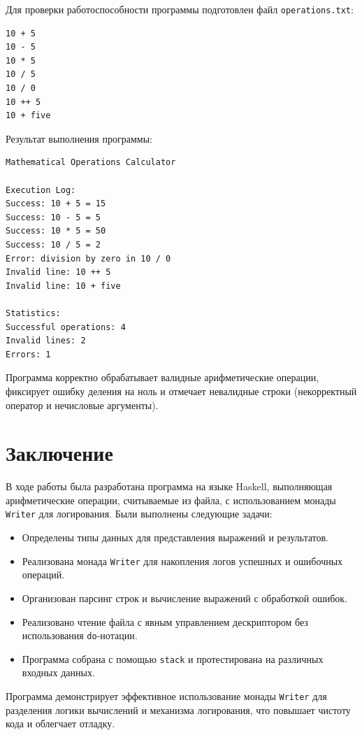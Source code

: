 \documentclass[a4paper, final]{article}
\begin{document}
Для проверки работоспособности программы подготовлен файл \texttt{operations.txt}:

\begin{verbatim}
10 + 5
10 - 5
10 * 5
10 / 5
10 / 0
10 ++ 5
10 + five
\end{verbatim}

Результат выполнения программы:

\begin{verbatim}
Mathematical Operations Calculator

Execution Log:
Success: 10 + 5 = 15
Success: 10 - 5 = 5  
Success: 10 * 5 = 50
Success: 10 / 5 = 2
Error: division by zero in 10 / 0
Invalid line: 10 ++ 5
Invalid line: 10 + five

Statistics:
Successful operations: 4
Invalid lines: 2
Errors: 1
\end{verbatim}

Программа корректно обрабатывает валидные арифметические операции, фиксирует ошибку деления на ноль и отмечает невалидные строки (некорректный оператор и нечисловые аргументы).

\newpage
\section*{Заключение}

В ходе работы была разработана программа на языке Haskell, выполняющая арифметические операции, считываемые из файла, с использованием монады \texttt{Writer} для логирования. Были выполнены следующие задачи:

\begin{itemize}
\item Определены типы данных для представления выражений и результатов.
\item Реализована монада \texttt{Writer} для накопления логов успешных и ошибочных операций.
\item Организован парсинг строк и вычисление выражений с обработкой ошибок.
\item Реализовано чтение файла с явным управлением дескриптором без использования \texttt{do}-нотации.
\item Программа собрана с помощью \texttt{stack} и протестирована на различных входных данных.
\end{itemize}

Программа демонстрирует эффективное использование монады \texttt{Writer} для разделения логики вычислений и механизма логирования, что повышает чистоту кода и облегчает отладку.
\end{document}
